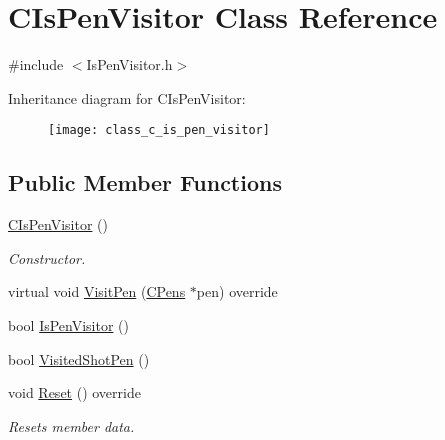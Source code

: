 \hypertarget{class_c_is_pen_visitor}{}\section{C\+Is\+Pen\+Visitor Class Reference}
\label{class_c_is_pen_visitor}


{\ttfamily \#include $<$Is\+Pen\+Visitor.\+h$>$}

Inheritance diagram for C\+Is\+Pen\+Visitor\+:\begin{figure}[H]
\begin{center}
\leavevmode
\texttt{[image: class\_c\_is\_pen\_visitor]}
\end{center}
\end{figure}
\subsection*{Public Member Functions}
\begin{DoxyCompactItemize}
\item 
\mbox{\label{class_c_is_pen_visitor_a1f6f4c1922ca5d9e6ab329fe6b271bcb}} 
\mbox{\hyperlink{class_c_is_pen_visitor_a1f6f4c1922ca5d9e6ab329fe6b271bcb}{C\+Is\+Pen\+Visitor}} ()
\begin{DoxyCompactList}\small\item\em Constructor. \end{DoxyCompactList}\item 
virtual void \mbox{\hyperlink{class_c_is_pen_visitor_ae48fb8bb94e5d10877ad5669df4bb86c}{Visit\+Pen}} (\mbox{\hyperlink{class_c_pens}{C\+Pens}} $\ast$pen) override
\item 
bool \mbox{\hyperlink{class_c_is_pen_visitor_a6f4f830ad5b5b349448ffc6b3c6c0b2d}{Is\+Pen\+Visitor}} ()
\item 
bool \mbox{\hyperlink{class_c_is_pen_visitor_a1e540f3b3c1c818da26de7dd5b233dfc}{Visited\+Shot\+Pen}} ()
\item 
\mbox{\label{class_c_is_pen_visitor_ab4b86002c6f48713a6f349a558c8191a}} 
void \mbox{\hyperlink{class_c_is_pen_visitor_ab4b86002c6f48713a6f349a558c8191a}{Reset}} () override
\begin{DoxyCompactList}\small\item\em Resets member data. \end{DoxyCompactList}\end{DoxyCompactItemize}


